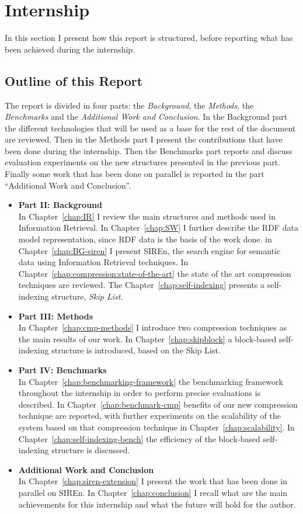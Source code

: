 \section{Internship}

In this section I present how this report is structured, before reporting what
has been achieved during the internship.

\subsection{Outline of this Report}

The report is divided in four parts: the \emph{Background}, the \emph{Methods},
the \emph{Benchmarks} and the \emph{Additional Work and Conclusion}. In the
Background part the different technologies that will be used as a base for the
rest of the document are reviewed. Then in the Methods part I present the
contributions that have been done during the internship. Then the Benchmarks
part reports and discuss evaluation experiments on the new structures
presented in the previous part. Finally some work that has been done on
parallel is reported in the part ``Additional Work and Conclusion''.

\begin{itemize}
  \item[] {\bfseries Part II: Background}\\
In Chapter~\ref{chap:IR} I review the main structures and methods used in
Information Retrieval. In Chapter~\ref{chap:SW} I further describe the RDF data
model representation, since RDF data is the basis of the work done. in
Chapter~\ref{chap:BG-siren} I present SIREn, the search engine for semantic
data using Information Retrieval techniques. In
Chapter~\ref{chap:compression:state-of-the-art} the state of the art compression
techniques are reviewed. The Chapter~\ref{chap:self-indexing} presents a
self-indexing structure, \emph{Skip List}.
  \item[] {\bfseries Part III: Methods}\\
In Chapter~\ref{chap:cmp-methods} I introduce two compression techniques as the
main results of our work. In Chapter~\ref{chap:skipblock} a block-based
self-indexing structure is introduced, based on the Skip List.
  \item[] {\bfseries Part IV: Benchmarks}\\
In Chapter~\ref{chap:benchmarking-framework} the benchmarking framework
throughout the internship in order to perform precise evaluations is described.
In Chapter~\ref{chap:benchmark-cmp} benefits of our new compression technique
are reported, with further experiments on the scalability of the system based
on that compression technique in Chapter~\ref{chap:scalability}. In
Chapter~\ref{chap:self-indexing-bench} the efficiency of the block-based
self-indexing structure is discussed.
\item[] {\bfseries Additional Work and Conclusion}\\
In Chapter~\ref{chap:siren-extension} I present the work that has been done in
parallel on SIREn. In Chapter~\ref{chap:conclusion} I recall what are the main
achievements for this internship and what the future will hold for the author.
\end{itemize}

